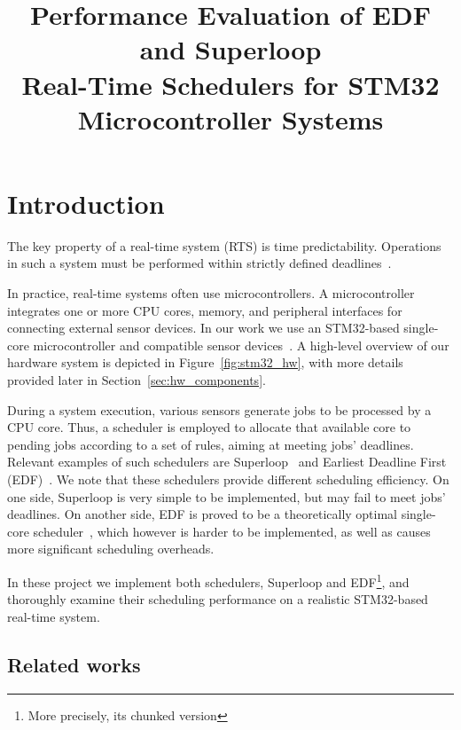 \documentclass[conference]{IEEEtran}
\begin{document}
\title{Performance Evaluation of EDF and Superloop\\Real-Time Schedulers for STM32 Microcontroller Systems}
\author{
}
\maketitle
\listoftodos

\section{Introduction}
The key property of a real-time system (RTS) is time predictability. Operations in such a system must be performed within strictly defined deadlines~\cite{LiuLayland1973}.

In practice, real-time systems often use microcontrollers. A microcontroller integrates one or more CPU cores, memory, and peripheral interfaces for connecting external sensor devices. In our work we use an STM32-based single-core microcontroller and compatible sensor devices~\cite{STM32EnvironmentMonitoring, STM32ConditionMonitoring}. A high-level overview of our hardware system is depicted in Figure~\ref{fig:stm32_hw}, with more details provided later in Section~\ref{sec:hw_components}.

During a system execution, various sensors generate jobs to be processed by a CPU core. Thus, a scheduler is employed to allocate that available core to pending jobs according to a set of rules, aiming at meeting jobs' deadlines. Relevant examples of such schedulers are Superloop~\cite{KeilSuperLoop} and Earliest Deadline First (EDF)~\cite{LiuLayland1973}. We note that these schedulers provide different scheduling efficiency. On one side, Superloop is very simple to be implemented, but may fail to meet jobs' deadlines. On another side, EDF is proved to be a theoretically optimal single-core scheduler~\cite{LiuLayland1973}, which however is harder to be implemented, as well as causes more significant scheduling overheads.

In these project we implement both schedulers, Superloop and EDF\footnote{More precisely, its chunked version}, and thoroughly examine their scheduling performance on a realistic STM32-based real-time system.


\subsection{Related works}
\end{document}
